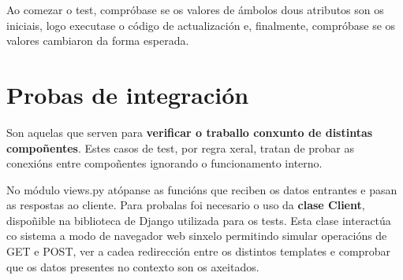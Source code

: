 Ao comezar o test, compróbase se os valores de ámbolos dous atributos son os iniciais, logo executase o código de actualización e, finalmente, compróbase se os valores cambiaron da forma esperada.

\section{Probas de integración}

Son aquelas que serven para \textbf{verificar o traballo conxunto de distintas compoñentes}. Estes casos de test, por regra xeral, tratan de probar as conexións entre compoñentes ignorando o funcionamento interno\cite{tests}.

No módulo views.py atópanse as funcións que reciben os datos entrantes e pasan as respostas ao cliente. Para probalas foi necesario o uso da \textbf{clase Client}, dispoñible na biblioteca de Django utilizada para os tests. Esta clase interactúa co sistema a modo de navegador web sinxelo permitindo simular operacións de GET e POST, ver a cadea redirección entre os distintos templates e comprobar que os datos presentes no contexto son os axeitados.

